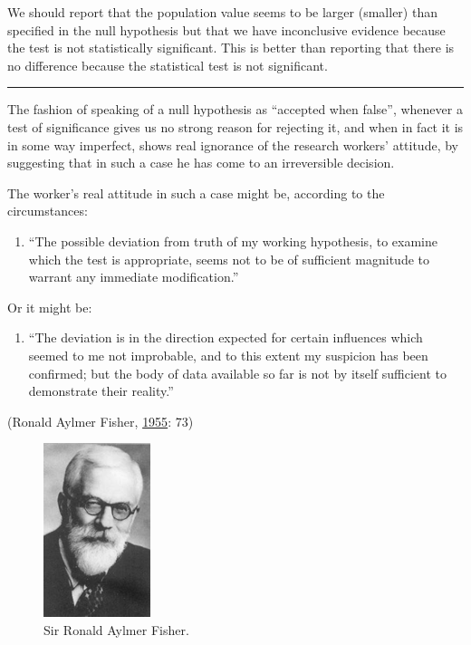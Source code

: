 \documentclass[a4paper]{book}
\providecommand{\tightlist}{%
  \setlength{\itemsep}{0pt}\setlength{\parskip}{0pt}}
\theoremstyle{definition}
\theoremstyle{definition}
\theoremstyle{definition}
\theoremstyle{remark}
\begin{document}
We should report that the population value seems to be larger (smaller)
than specified in the null hypothesis but that we have inconclusive
evidence because the test is not statistically significant. This is
better than reporting that there is no difference because the
statistical test is not significant.

\begin{center}\rule{0.5\linewidth}{\linethickness}\end{center}

The fashion of speaking of a null hypothesis as ``accepted when false'',
whenever a test of significance gives us no strong reason for rejecting
it, and when in fact it is in some way imperfect, shows real ignorance
of the research workers' attitude, by suggesting that in such a case he
has come to an irreversible decision.

The worker's real attitude in such a case might be, according to the
circumstances:

\begin{enumerate}
\def\labelenumi{(\alph{enumi})}
\tightlist
\item
  ``The possible deviation from truth of my working hypothesis, to
  examine which the test is appropriate, seems not to be of sufficient
  magnitude to warrant any immediate modification.''
\end{enumerate}

Or it might be:

\begin{enumerate}
\def\labelenumi{(\alph{enumi})}
\setcounter{enumi}{1}
\tightlist
\item
  ``The deviation is in the direction expected for certain influences
  which seemed to me not improbable, and to this extent my suspicion has
  been confirmed; but the body of data available so far is not by itself
  sufficient to demonstrate their reality.''
\end{enumerate}

(Ronald Aylmer Fisher, \protect\hyperlink{ref-RefWorks:3907}{1955}: 73)

\begin{figure}[H]
\centering
\includegraphics{figures/fisher.png}
\caption{Sir Ronald Aylmer Fisher.}
\end{figure}
\end{document}
